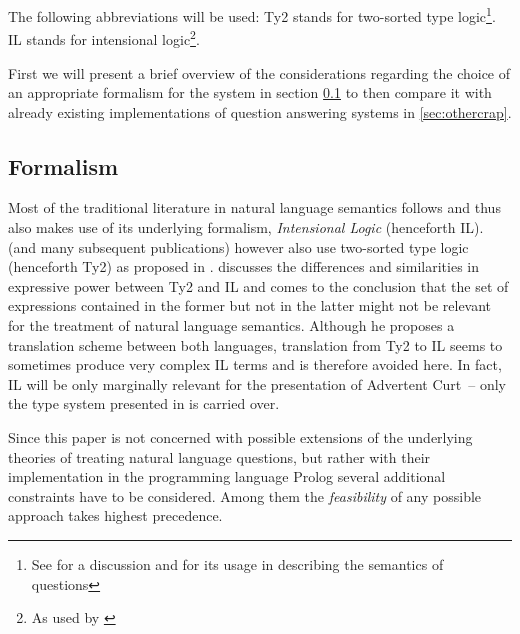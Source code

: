 \documentclass[12pt,a4paper]{article}
\newcommand{\abbr}{\textsf} %
\newcommand{\pn}{\textsf} %
\newcommand{\acurt}{\pn{Advertent Curt}\mbox{ }}
\theoremstyle{remark} \newtheorem*{termin}{Terminology} %
\begin{document}
The following abbreviations will be used: 
\abbr{Ty2} stands for two-sorted type logic\footnote{See \cite{gallin:ty2} for a
discussion and \cite{gs:sqpa} for its usage in describing the semantics of
questions}. \abbr{IL} stands for intensional logic\footnote{As used by \cite{ptq}}. 


First we will present a brief overview of the considerations regarding the
choice of an appropriate formalism for the system in section \ref{sec:formal}
to then compare it with already existing implementations of question answering
systems in \ref{sec:othercrap}.

\subsection{Formalism}\label{sec:formal}


Most of the traditional literature in natural language semantics follows
\cite{ptq} and thus also makes use of its underlying formalism,
\emph{Intensional Logic} (henceforth \abbr{IL}). \cite{gs:sqpa} (and many subsequent
publications) however also use two-sorted type logic (henceforth \abbr{Ty2}) as
proposed in \cite{gallin:ty2}. \cite{z:ilty2} discusses the differences and
similarities in expressive power between \abbr{Ty2} and \abbr{IL} and comes to
the conclusion that the set of expressions contained in the former but not in
the latter might not be relevant for the treatment of natural language
semantics. Although he proposes a translation scheme between both languages,
translation from \abbr{Ty2} to \abbr{IL} seems to sometimes produce very complex
\abbr{IL} terms and is therefore avoided here. In fact, \abbr{IL} will be only
marginally relevant for the presentation of \acurt – only the type system
presented in \cite{ptq} is carried over.


Since this paper is not concerned with possible extensions of the underlying
theories of treating natural language questions, but rather with their
implementation in the programming language \pn{Prolog} several additional
constraints have to be considered. Among them the \emph{feasibility} of any
possible approach takes highest precedence.
\end{document}

